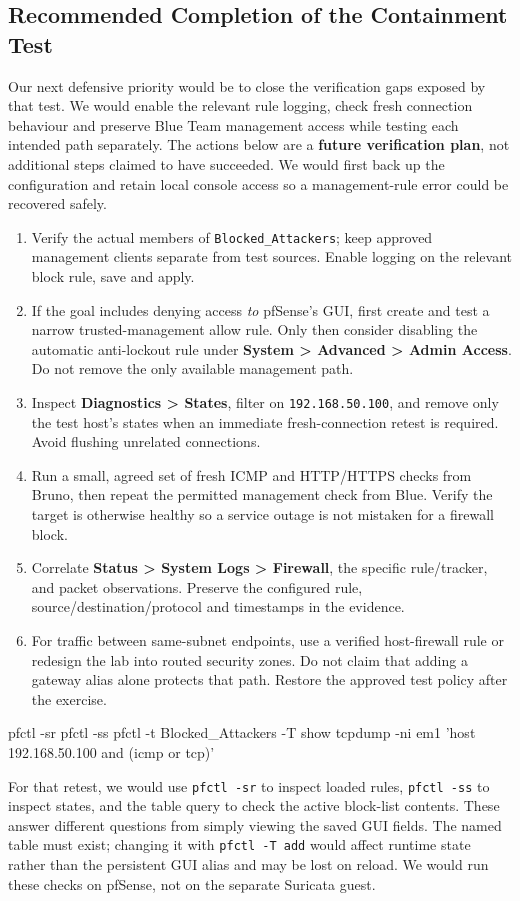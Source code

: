 \documentclass[11pt,a4paper]{article}
\begin{document}
\subsection{Recommended Completion of the Containment Test}
Our next defensive priority would be to close the verification gaps exposed by that test. We would enable the relevant rule logging, check fresh connection behaviour and preserve Blue Team management access while testing each intended path separately. The actions below are a \textbf{future verification plan}, not additional steps claimed to have succeeded. We would first back up the configuration and retain local console access so a management-rule error could be recovered safely.
\begin{enumerate}
\item Verify the actual members of \texttt{Blocked\_Attackers}; keep approved management clients separate from test sources. Enable logging on the relevant block rule, save and apply.
\item If the goal includes denying access \emph{to} pfSense's GUI, first create and test a narrow trusted-management allow rule. Only then consider disabling the automatic anti-lockout rule under \textbf{System > Advanced > Admin Access}. Do not remove the only available management path.
\item Inspect \textbf{Diagnostics > States}, filter on \texttt{192.168.50.100}, and remove only the test host's states when an immediate fresh-connection retest is required. Avoid flushing unrelated connections.
\item Run a small, agreed set of fresh ICMP and HTTP/HTTPS checks from Bruno, then repeat the permitted management check from Blue. Verify the target is otherwise healthy so a service outage is not mistaken for a firewall block.
\item Correlate \textbf{Status > System Logs > Firewall}, the specific rule/tracker, and packet observations. Preserve the configured rule, source/destination/protocol and timestamps in the evidence.
\item For traffic between same-subnet endpoints, use a verified host-firewall rule or redesign the lab into routed security zones. Do not claim that adding a gateway alias alone protects that path. Restore the approved test policy after the exercise.
\end{enumerate}

\begin{cmdbox}
\begin{reportcode}
pfctl -sr
pfctl -ss
pfctl -t Blocked_Attackers -T show
tcpdump -ni em1 'host 192.168.50.100 and (icmp or tcp)'
\end{reportcode}
\end{cmdbox}
For that retest, we would use \texttt{pfctl -sr} to inspect loaded rules, \texttt{pfctl -ss} to inspect states, and the table query to check the active block-list contents. These answer different questions from simply viewing the saved GUI fields. The named table must exist; changing it with \texttt{pfctl -T add} would affect runtime state rather than the persistent GUI alias and may be lost on reload. We would run these checks on pfSense, not on the separate Suricata guest.
\end{document}
